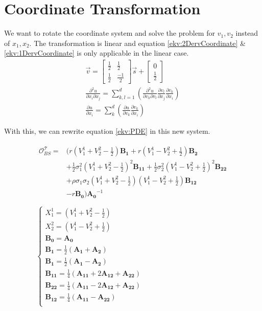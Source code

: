\documentclass[a4paper]{article}      %
\begin{document}
\section*{Coordinate Transformation}
We want to rotate the coordinate system and solve the problem for $v_1, v_2$ instead of  $x_1, x_2$. The transformation is linear and equation \ref{ekv:2DervCoordinate} \& \ref{ekv:1DervCoordinate} is only applicable in the linear case. 
\begin{gather}
\vec{v} =
\begin{bmatrix}
\frac{1}{2} & \frac{1}{2} \\ \frac{1}{2} & \frac{-1}{2}
\end{bmatrix}
\vec{s} +
\begin{bmatrix}
0 \\ \frac{1}{2}
\end{bmatrix} \\
\frac{\partial^2 u}{\partial {x_i}\partial {x_j}} =
\sum_{k,l = 1}^d 
\left( 
\frac{\partial^2 u}{\partial {v_k}\partial {v_l}}
\frac{\partial v_l}{\partial {x_j}}
\frac{\partial v_k}{\partial {x_i}}
\right) \label{ekv:2DervCoordinate}\\
\frac{\partial u}{\partial x_i}
= \sum_k^d
\left(
\frac{\partial u}{\partial v_k}
\frac{\partial v_k}{\partial x_i}
\right) \label{ekv:1DervCoordinate}
\end{gather}

With this, we can rewrite equation \ref{ekv:PDE} in this new system.

\begin{gather}
\begin{aligned}
 \mathcal{O}_{BS}^\mathcal{T} =& \Big( r(V_1^1 + V_2^2 - \frac{1}{2}) \mathbf{B_1} + r(V_1^1 - V_2^2 + \frac{1}{2}) \mathbf{B_2} \\
&+ \frac{1}{2} \sigma_1^2 (V_1^1 + V_2^2 - \frac{1}{2})^2 \mathbf{B_{11}} 
+ \frac{1}{2} \sigma_2^2 (V_1^1 - V_2^2 + \frac{1}{2})^2 \mathbf{B_{22}} \\
&+ \rho \sigma_1 \sigma_2 (V_1^1 + V_2^2 - \frac{1}{2}) (V_1^1 - V_2^2 + \frac{1}{2}) \mathbf{B_{12}} \\
& - r\mathbf{B_0} \Big) \mathbf{A_0}^{-1} \\
\end{aligned}
\\
\begin{cases}
X_1^1 = (V_1^1 + V_2^2 - \frac{1}{2}) \\
X_2^2 = (V_1^1 - V_2^2 + \frac{1}{2}) \\
\mathbf{B_0} = \mathbf{A_0} \\
\mathbf{B_1} = \frac{1}{2}(\mathbf{A_1} + \mathbf{A_2}) \\
\mathbf{B_1} = \frac{1}{2}(\mathbf{A_1} - \mathbf{A_2}) \\
\mathbf{B_{11}} = \frac{1}{4}(\mathbf{A_{11}} + 2\mathbf{A_{12}} + \mathbf{A_{22}}) \\
\mathbf{B_{22}} = \frac{1}{4}(\mathbf{A_{11}} - 2\mathbf{A_{12}} + \mathbf{A_{22}}) \\
\mathbf{B_{12}} = \frac{1}{4}(\mathbf{A_{11}} - \mathbf{A_{22}}) \\
\end{cases}
\end{gather}
\end{document}
